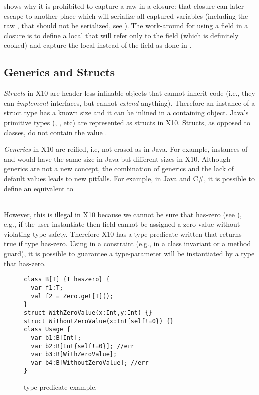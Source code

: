  shows why it is prohibited to capture a raw \this in a closure:
    that closure can later escape to another place which will serialize all captured variables
    (including the raw \this, that should not be serialized, see ).
The work-around for using a field in a closure is to define a local that will refer only to the field (which is definitely cooked)
    and capture the local instead of the field as done in .



\subsection{Generics and Structs}
\label{Section:Generics-and-Structs}
\emph{Structs} in X10 are header-less inlinable objects
    that cannot inherit code (i.e., they can \emph{implement} interfaces, but cannot \emph{extend} anything).
Therefore an instance of a struct type has a known size and it can be inlined in a containing object.
Java's primitive types (, , etc) are represented as structs in X10.
Structs, as opposed to classes, do not contain the value .

\emph{Generics} in X10 are reified, i.e, not erased as in Java.
For example, instances of  and 
    would have the same size in Java but different sizes in X10.
Although generics are not a new concept,
    the combination of generics and the lack of default values
    leads to new pitfalls.
For example, in Java and C\#, it is possible to define an equivalent to

~~~~~~~\\
However, this is illegal in X10 because we cannot be sure that  has-zero (see ),
    e.g., if the user instantiate  then field  cannot be assigned a zero value
    without violating type-safety.
Therefore X10 has a type predicate written  that returns true if type  has-zero.
Using  in a constraint (e.g., in a class invariant or a method guard),
    it is possible to guarantee a type-parameter will be instantiated by a type that has-zero.

\begin{figure}
\begin{lstlisting}
class B[T] {T haszero} {
  var f1:T;
  val f2 = Zero.get[T]();
}
struct WithZeroValue(x:Int,y:Int) {}
struct WithoutZeroValue(x:Int{self!=0}) {}
class Usage {
  var b1:B[Int];
  var b2:B[Int{self!=0}]; //err
  var b3:B[WithZeroValue];
  var b4:B[WithoutZeroValue]; //err
}
\end{lstlisting}
    \caption{ type predicate example.
    }
\label{Figure:Generics}
\end{figure}




